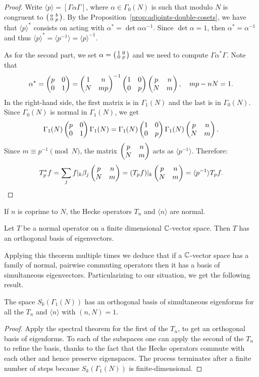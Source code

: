 \begin{proof}
Write $\langle p\rangle = [\Gamma\alpha\Gamma]$, where $\alpha\in\Gamma_0(N)$ is such that modulo $N$ is congruent to $\left(\begin{smallmatrix}a&b\\0&p\end{smallmatrix}\right)$. By the Proposition~\ref{prop:adjoints-double-cosets}, we have that $\langle p\rangle^*$ consists on acting with $\alpha^*=\det\alpha \alpha^{-1}$. Since $\det\alpha=1$, then $\alpha^*=\alpha^{-1}$ and thus $\langle p\rangle^* = \langle p^{-1}\rangle = \langle p\rangle^{-1}$.

As for the second part, we set $\alpha=\left(\begin{smallmatrix}1&0\\0&p\end{smallmatrix}\right)$ and we need to compute $\Gamma\alpha^*\Gamma$. Note that
\[
\alpha^*=\left(\begin{matrix}p&0\\0&1\end{matrix}\right)=\left(\begin{matrix}1&n\\N&mp\end{matrix}\right) ^{-1} \left(\begin{matrix}1&0\\0&p\end{matrix}\right) \left(\begin{matrix}p&n\\N&m\end{matrix}\right),\quad mp-nN=1.
\]
In the right-hand side, the first matrix is in $\Gamma_1(N)$ and the last is in $\Gamma_0(N)$. Since $\Gamma_0(N)$ is normal in $\Gamma_1(N)$, we get
\[
\Gamma_1(N)\left(\begin{matrix}p&0\\0&1\end{matrix}\right)\Gamma_1(N)=\Gamma_1(N)\left(\begin{matrix}1&0\\0&p\end{matrix}\right)\Gamma_1(N)\left(\begin{matrix}p&n\\N&m\end{matrix}\right).
\]
Since $m\equiv p^{-1}\pmod N$, the matrix $\left(\begin{matrix}p&n\\N&m\end{matrix}\right)$ acts as $\langle p^{-1}\rangle$. Therefore:
\[
T_p^*f = \sum_j f|_k\beta_j \left(\begin{matrix}p&n\\N&m\end{matrix}\right) = (T_pf)|_k \left(\begin{matrix}p&n\\N&m\end{matrix}\right) = \langle p^{-1}\rangle T_p f.
\]

\end{proof}
\begin{corollary}
  If $n$ is coprime to $N$, the Hecke operators $T_n$ and $\langle n\rangle$ are normal.
\end{corollary}

\begin{theorem}
  Let $T$ be a normal operator on a finite dimensional $\mathbb{C}$-vector space. Then $T$ has an orthogonal basis of eigenvectors.
\end{theorem}
Applying this theorem multiple times we deduce that if a $\mathbb{C}$-vector space has a family of normal, pairwise commuting operators then it has a basis of simultaneous eigenvectors. Particularizing to our situation, we get the following result.
\begin{corollary}
  The space $S_k(\Gamma_1(N))$ has an orthogonal basis of simultaneous eigenforms for all the $T_n$ and $\langle n\rangle$ with $(n,N)=1$.
\end{corollary}
\begin{proof}
  Apply the spectral theorem for the first of the $T_n$, to get an orthogonal basis of eigenforms. To each of the subspaces one can apply the second of the $T_n$ to refine the basis, thanks to the fact that the Hecke operators commute with each other and hence preserve eigenspaces. The process terminates after a finite number of steps because $S_k(\Gamma_1(N))$ is finite-dimensional.
\end{proof}


